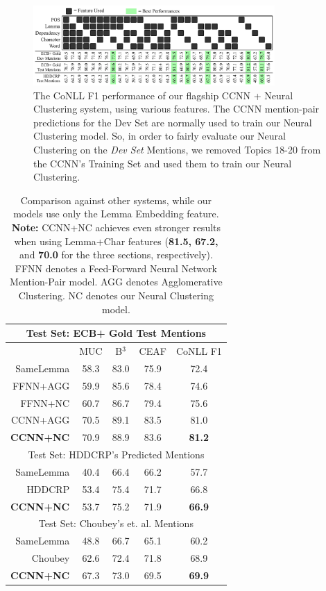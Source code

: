 \documentclass[11pt,a4paper]{article}
\begin{document}
\begin{figure}[h]
\centering
	\includegraphics[width=0.82\textwidth]{features.pdf}
	\caption{The CoNLL F1 performance of our flagship CCNN + Neural Clustering system, using various features.  The CCNN mention-pair predictions for the Dev Set are normally used to train our Neural Clustering model.  So, in order to fairly evaluate our Neural Clustering on the \textit{Dev Set} Mentions, we removed Topics 18-20 from the CCNN's Training Set and used them to train our Neural Clustering.}
	\label{fig:allfeatures}
\end{figure}

\begin{table}[h]
\centering
\tabcolsep=0.11cm
\begin{tabular}{|r|ccc|c|}
 \hline
 \multicolumn{5}{|c|}{Test Set: ECB+ Gold Test Mentions} \\
 \hline
& MUC & B$^3$ & CEAF & CoNLL F1\\
 \hline
 SameLemma& 58.3 & 83.0 & 75.9 & 72.4\\
FFNN+AGG & 59.9 & 85.6 & 78.4 & 74.6 \\
FFNN+NC & 60.7 & 86.7 &  79.4 & 75.6 \\
CCNN+AGG & 70.5 & 89.1 & 83.5  & 81.0\\
\textbf{CCNN+NC}  & 70.9 & 88.9 & 83.6 & \textbf{81.2} \\
\hline
\hline
 \multicolumn{5}{|c|}{Test Set: HDDCRP's Predicted Mentions} \\
 \hline
 SameLemma& 40.4 & 66.4 & 66.2 & 57.7\\
 HDDCRP & 53.4 & 75.4 & 71.7  & 66.8\\
 \textbf{CCNN+NC} & 53.7 & 75.2 & 71.9  & \textbf{66.9}\\
 \hline
\hline
 \multicolumn{5}{|c|}{Test Set: Choubey's et. al. Mentions} \\
 \hline
 SameLemma& 48.8 & 66.7 & 65.1 & 60.2\\
 Choubey & 62.6 & 72.4 & 71.8  & 68.9\\
 \textbf{CCNN+NC} & 67.3 & 73.0 & 69.5  & \textbf{69.9}\\
 \hline
\end{tabular}
\caption{Comparison against other systems, while our models use only the Lemma Embedding feature.  \textbf{Note:} CCNN+NC achieves even stronger results when using Lemma+Char features (\textbf{81.5, 67.2,} and \textbf{70.0} for the three sections, respectively). FFNN denotes a Feed-Forward Neural Network Mention-Pair model.  AGG denotes Agglomerative Clustering.  NC denotes our Neural Clustering model.}
\label{tab:others}
\end{table}
\end{document}
